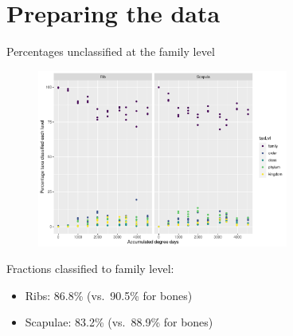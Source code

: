 \documentclass{beamer}
\date{May 2021}
\begin{document}









\section[Preparation]{Preparing the data}



\begin{frame}{Percentages unclassified at the family level}

  \begin{center}
    \begin{figure}
      \includegraphics[width=3.25in]{swabs_family_perc_classif_by_add_type}
    \end{figure}
  \end{center}
  \vspace{-0.1in}
  {\footnotesize
  Fractions classified to family level:
  \begin{itemize}
    \item Ribs: 86.8\% (vs.\ 90.5\% for bones)
    \item Scapulae: 83.2\% (vs.\ 88.9\% for bones)
  \end{itemize}
  }
\end{frame}
\end{document}
